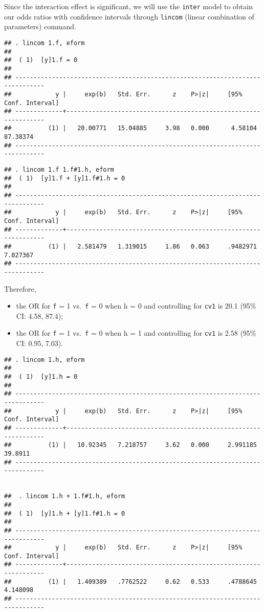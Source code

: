 \documentclass[
]{article}
\providecommand{\tightlist}{%
  \setlength{\itemsep}{0pt}\setlength{\parskip}{0pt}}
\begin{document}
\newpage

Since the interaction effect is significant, we will use the
\texttt{inter} model to obtain our odds ratios with confidence intervals
through \texttt{lincom} (linear combination of parameters) command.

\begin{verbatim}
## . lincom 1.f, eform
## 
##  ( 1)  [y]1.f = 0
## 
## ------------------------------------------------------------------------------
##            y |     exp(b)   Std. Err.      z    P>|z|     [95% Conf. Interval]
## -------------+----------------------------------------------------------------
##          (1) |   20.00771   15.04885     3.98   0.000      4.58104    87.38374
## ------------------------------------------------------------------------------
\end{verbatim}

\begin{verbatim}
## . lincom 1.f 1.f#1.h, eform
##  ( 1)  [y]1.f + [y]1.f#1.h = 0
## 
## ------------------------------------------------------------------------------
##            y |     exp(b)   Std. Err.      z    P>|z|     [95% Conf. Interval]
## -------------+----------------------------------------------------------------
##          (1) |   2.581479   1.319015     1.86   0.063     .9482971    7.027367
## ------------------------------------------------------------------------------
\end{verbatim}

Therefore,

\begin{itemize}
\tightlist
\item
  the OR for \texttt{f} = 1 vs.~\texttt{f} = 0 when h = 0 and
  controlling for \texttt{cv1} is 20.1 (95\% CI: 4.58, 87.4);
\item
  the OR for \texttt{f} = 1 vs.~\texttt{f} = 0 when h = 1 and
  controlling for \texttt{cv1} is 2.58 (95\% CI: 0.95, 7.03).
\end{itemize}

\begin{verbatim}
## . lincom 1.h, eform
## 
##  ( 1)  [y]1.h = 0
## 
## ------------------------------------------------------------------------------
##            y |     exp(b)   Std. Err.      z    P>|z|     [95% Conf. Interval]
## -------------+----------------------------------------------------------------
##          (1) |   10.92345   7.218757     3.62   0.000     2.991185     39.8911
## ------------------------------------------------------------------------------


##  . lincom 1.h + 1.f#1.h, eform
##
##  ( 1)  [y]1.h + [y]1.f#1.h = 0
##
## ------------------------------------------------------------------------------
##            y |     exp(b)   Std. Err.      z    P>|z|     [95% Conf. Interval]
## -------------+----------------------------------------------------------------
##          (1) |   1.409389   .7762522     0.62   0.533     .4788645    4.148098
## ------------------------------------------------------------------------------
\end{verbatim}
\end{document}

